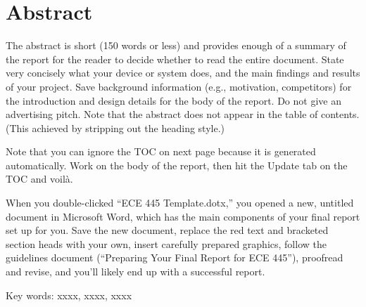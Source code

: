 \clearpage
\section*{Abstract}


The abstract is short (150 words or less) and provides enough of a summary of the report for the reader to decide whether to read the entire document. State very concisely what your device or system does, and the main findings and results of your project. Save background information (e.g., motivation, competitors) for the introduction and design details for the body of the report. Do not give an advertising pitch. Note that the abstract does not appear in the table of contents. (This achieved by stripping out the heading style.)

Note that you can ignore the TOC on next page because it is generated automatically. Work on the body of the report, then hit the Update tab on the TOC and voilà.

When you double-clicked “ECE 445 Template.dotx,” you opened a new, untitled document in Microsoft Word, which has the main components of your final report set up for you. Save the new document, replace the red text and bracketed section heads with your own, insert carefully prepared graphics, follow the guidelines document (“Preparing Your Final Report for ECE 445”), proofread and revise, and you’ll likely end up with a successful report.

Key words: xxxx, xxxx, xxxx
